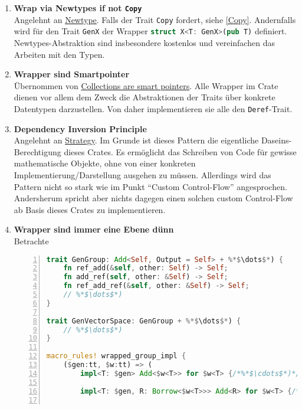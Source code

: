 \documentclass[12pt]{article}
\begin{document}
\begin{enumerate}[1)]
\item \textbf{Wrap via Newtypes if not \texttt{Copy}}\\
Angelehnt an \href{https://rust-unofficial.github.io/patterns/patterns/behavioural/newtype.html}{Newtype}. Falls der Trait \texttt{Copy} fordert, siehe \ref{Copy}. Andernfalls wird für den Trait \lstinline[language=Rust, morekeywords={GenX}]|GenX| der Wrapper \lstinline[language=Rust, morekeywords={GenX, X, T}]|struct X<T: GenX>(pub T)| definiert. Newtypes-Abstraktion sind insbesondere kostenlos und vereinfachen das Arbeiten mit den Typen.
\item \textbf{Wrapper sind Smartpointer}\\
Übernommen von \href{https://rust-unofficial.github.io/patterns/idioms/deref.html}{Collections are smart pointers}. Alle Wrapper im Crate dienen vor allem dem Zweck die Abstraktionen der Traits über konkrete Datentypen darzustellen. Von daher implementieren sie alle den \texttt{Deref}-Trait.
\item \textbf{Dependency Inversion Principle}\\
Angelehnt an \href{https://rust-unofficial.github.io/patterns/patterns/behavioural/strategy.html}{Strategy}. Im Grunde ist dieses Pattern die eigentliche Daseins-Berechtigung dieses Crates. Es ermöglicht das Schreiben von Code für gewisse mathematische Objekte, ohne von einer konkreten Implementierung/Darstellung ausgehen zu müssen. Allerdings wird das Pattern nicht so stark wie im Punkt ``Custom Control-Flow'' angesprochen. Andersherum spricht aber nichts dagegen einen solchen custom Control-Flow ab Basis dieses Crates zu implementieren.
\item \textbf{Wrapper sind immer eine Ebene dünn}\\
Betrachte %
\begin{lstlisting}[language=Rust, numbers=left, emph={wrapped_group_impl!}, morekeywords={R, ops}]
trait GenGroup: Add<Self, Output = Self> + %*$\dots$*) {
	fn ref_add(&self, other: Self) -> Self;
	fn add_ref(self, other: &Self) -> Self;
	fn ref_add_ref(&self, other: &Self) -> Self;
	// %*$\dots$*)
}

trait GenVectorSpace: GenGroup + %*$\dots$*) {
	// %*$\dots$*)
}

macro_rules! wrapped_group_impl {
	($gen:tt, $w:tt) => (
		impl<T: $gen> Add<$w<T>> for $w<T> {/*%*$\cdots$*)*/}

		impl<T: $gen, R: Borrow<$w<T>>> Add<R> for $w<T> {/*%*$\cdots$*)*/}


\end{lstlisting}
\end{enumerate}
\end{document}
